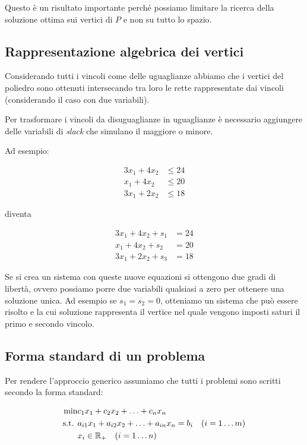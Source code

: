 Questo è un risultato importante perché possiamo limitare la ricerca della soluzione ottima sui vertici di $P$ e non su tutto lo spazio.

\subsection{Rappresentazione algebrica dei vertici}

Considerando tutti i vincoli come delle uguaglianze abbiamo che i vertici del poliedro sono ottenuti intersecando tra loro le rette rappresentate dai vincoli (considerando il caso con due variabili).

Per trasformare i vincoli da disuguaglianze in uguaglianze è necessario aggiungere delle variabili di \textit{slack} che simulano il maggiore o minore.

Ad esempio:

\begin{align*}
3x_1 + 4x_2 &\leq 24 \\
x_1 + 4x_2 &\leq 20 \\
3x_1 + 2x_2 &\leq 18
\end{align*}

\noindent diventa

\begin{align*}
3x_1 + 4x_2 +s_1&= 24 \\
x_1 + 4x_2 +s_2&= 20 \\
3x_1 + 2x_2 +s_3&= 18
\end{align*}

Se si crea un sistema con queste nuove equazioni si ottengono due gradi di libertà, ovvero possiamo porre due variabili qualsiasi a zero per ottenere una soluzione unica.
Ad esempio se $s_1 = s_2=0$, otteniamo un sistema che può essere risolto e la cui soluzione rappresenta il vertice nel quale vengono imposti saturi il primo e secondo vincolo.

\subsection{Forma standard di un problema}

Per rendere l'approccio generico assumiamo che tutti i problemi sono scritti secondo la forma standard:

\begin{align*}
\min &c_1x_1+ c_2x_2 +\ldots + c_nx_n \\
\text{s.t. } &a_{i1}x_1 + a_{i2}x_2 +\ldots+a_{in}x_n = b_i \quad (i = 1 \ldots m) \\
&x_i \in \mathbb{R}_+ \quad (i = 1 \ldots n)
\end{align*}


